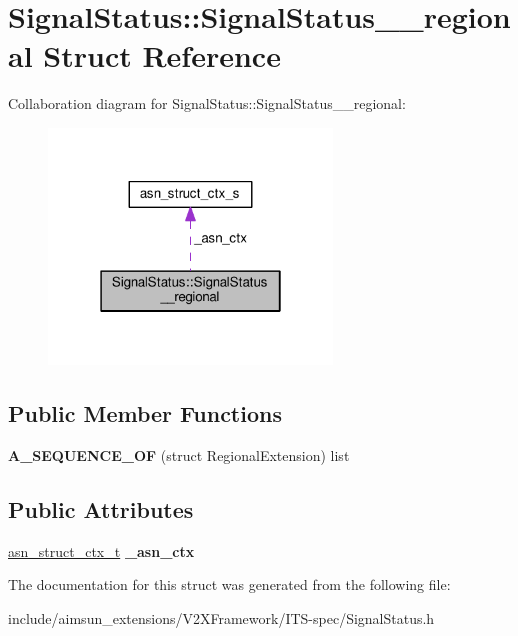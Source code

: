 \hypertarget{structSignalStatus_1_1SignalStatus____regional}{}\section{Signal\+Status\+:\+:Signal\+Status\+\_\+\+\_\+regional Struct Reference}
\label{structSignalStatus_1_1SignalStatus____regional}


Collaboration diagram for Signal\+Status\+:\+:Signal\+Status\+\_\+\+\_\+regional\+:\nopagebreak
\begin{figure}[H]
\begin{center}
\leavevmode
\includegraphics[width=214pt]{structSignalStatus_1_1SignalStatus____regional__coll__graph}
\end{center}
\end{figure}
\subsection*{Public Member Functions}
\begin{DoxyCompactItemize}
\item 
{\bfseries A\+\_\+\+S\+E\+Q\+U\+E\+N\+C\+E\+\_\+\+OF} (struct Regional\+Extension) list\hypertarget{structSignalStatus_1_1SignalStatus____regional_af9c7ce91ae5ac458a71f6797433bca43}{}\label{structSignalStatus_1_1SignalStatus____regional_af9c7ce91ae5ac458a71f6797433bca43}

\end{DoxyCompactItemize}
\subsection*{Public Attributes}
\begin{DoxyCompactItemize}
\item 
\hyperlink{structasn__struct__ctx__s}{asn\+\_\+struct\+\_\+ctx\+\_\+t} {\bfseries \+\_\+asn\+\_\+ctx}\hypertarget{structSignalStatus_1_1SignalStatus____regional_aba162cbfef1ac3be64d7fce6a7fdc45e}{}\label{structSignalStatus_1_1SignalStatus____regional_aba162cbfef1ac3be64d7fce6a7fdc45e}

\end{DoxyCompactItemize}


The documentation for this struct was generated from the following file\+:\begin{DoxyCompactItemize}
\item 
include/aimsun\+\_\+extensions/\+V2\+X\+Framework/\+I\+T\+S-\/spec/Signal\+Status.\+h\end{DoxyCompactItemize}
